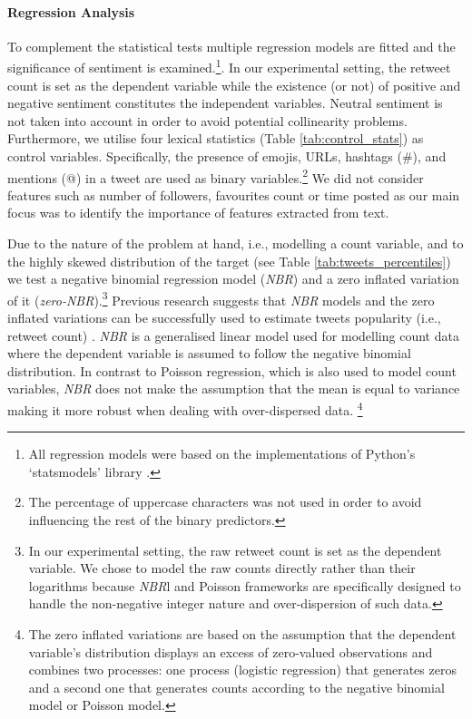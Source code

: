 \paragraph{Regression Analysis} To complement the statistical tests multiple regression models are fitted and the significance of sentiment is examined.\footnote{All regression models were based on the implementations of Python's `statsmodels' library  \cite{seabold2010statsmodels}.}. In our experimental setting, the retweet count is set as the dependent variable while the existence (or not) of positive and negative sentiment constitutes the independent variables. Neutral sentiment is not taken into account in order to avoid potential collinearity problems. Furthermore, we utilise four lexical statistics (Table \ref{tab:control_stats}) as control variables. Specifically, the presence of emojis, URLs, hashtags (\#),  and mentions (@) in a tweet are used as binary variables.\footnote{The percentage of uppercase characters was not used in order to avoid influencing the rest of the binary predictors.} We did not consider features such as number of followers, favourites count or time posted as our main focus was to identify the importance of features extracted from text. 


Due to the nature of the problem at hand, i.e., modelling a count variable, and to the highly skewed distribution of the target (see Table \ref{tab:tweets_percentiles}) we test a negative binomial regression model (\textit{NBR}) \cite{hilbe2011negative} and a zero inflated variation of it (\textit{zero-NBR}).\footnote{In our experimental setting, the raw retweet count is set as the dependent variable. We chose to model the raw counts directly rather than their logarithms because \textit{NBR}l and Poisson frameworks are specifically designed to handle the non-negative integer nature and over-dispersion of such data.} Previous research suggests that \textit{NBR} models and the zero inflated variations can be successfully used to estimate tweets popularity (i.e., retweet count) \cite{bhattacharya2014engagement, sutton2015cross, samuel2020message}. \textit{NBR} is a generalised linear model used for modelling count data where the dependent variable is assumed to follow the negative binomial distribution. In contrast to Poisson regression, which is also used to model count variables, \textit{NBR} does not make the assumption that the mean is equal to variance making it more robust when dealing with over-dispersed data. \footnote{\label{note1}The zero inflated variations are based on the assumption that the dependent variable's distribution displays an excess of zero-valued observations and combines two processes: one process (logistic regression) that generates zeros and a second one that generates counts according to the negative binomial model or Poisson model.}

